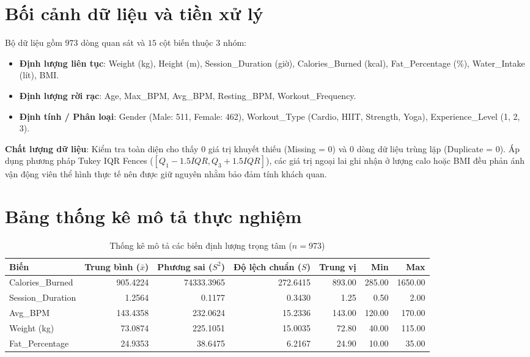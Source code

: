 \documentclass[12pt,a4paper]{report}
\begin{document}
\section{Bối cảnh dữ liệu và tiền xử lý}
Bộ dữ liệu gồm $973$ dòng quan sát và $15$ cột biến thuộc 3 nhóm:
\begin{itemize}
    \item \textbf{Định lượng liên tục}: Weight (kg), Height (m), Session\_Duration (giờ), Calories\_Burned (kcal), Fat\_Percentage (\%), Water\_Intake (lít), BMI.
    \item \textbf{Định lượng rời rạc}: Age, Max\_BPM, Avg\_BPM, Resting\_BPM, Workout\_Frequency.
    \item \textbf{Định tính / Phân loại}: Gender (Male: 511, Female: 462), Workout\_Type (Cardio, HIIT, Strength, Yoga), Experience\_Level (1, 2, 3).
\end{itemize}

\textbf{Chất lượng dữ liệu}: Kiểm tra toàn diện cho thấy $0$ giá trị khuyết thiếu (Missing = 0) và $0$ dòng dữ liệu trùng lặp (Duplicate = 0). Áp dụng phương pháp Tukey IQR Fences ($[Q_1 - 1.5 IQR, Q_3 + 1.5 IQR]$), các giá trị ngoại lai ghi nhận ở lượng calo hoặc BMI đều phản ánh vận động viên thể hình thực tế nên được giữ nguyên nhằm bảo đảm tính khách quan.

\section{Bảng thống kê mô tả thực nghiệm}
\begin{table}[htbp]
\centering\small
\caption{Thống kê mô tả các biến định lượng trọng tâm ($n = 973$)}
\begin{tabular}{lrrrrrr}
\toprule
\textbf{Biến} & \textbf{Trung bình ($\bar{x}$)} & \textbf{Phương sai ($S^2$)} & \textbf{Độ lệch chuẩn ($S$)} & \textbf{Trung vị} & \textbf{Min} & \textbf{Max} \\
\midrule
Calories\_Burned & 905.4224 & 74333.3965 & 272.6415 & 893.00 & 285.00 & 1650.00 \\
Session\_Duration & 1.2564 & 0.1177 & 0.3430 & 1.25 & 0.50 & 2.00 \\
Avg\_BPM & 143.4358 & 232.0624 & 15.2336 & 143.00 & 120.00 & 170.00 \\
Weight (kg) & 73.0874 & 225.1051 & 15.0035 & 72.80 & 40.00 & 115.00 \\
Fat\_Percentage & 24.9353 & 38.6475 & 6.2167 & 24.90 & 10.00 & 35.00 \\
\bottomrule
\end{tabular}
\end{table}
\end{document}
